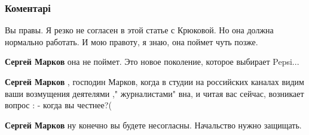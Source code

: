  
 
 
 
 
\subsubsection{Коментарі}

\begin{itemize}
 

Вы правы. Я резко не согласен в этой статье с Крюковой. Но она должна нормально
работать. И мою правоту, я знаю, она поймет чуть позже.

\begin{itemize}
 
\textbf{Сергей Марков} она не поймет. Это новое поколение, которое выбирает Pepsi...

 
\textbf{Сергей Марков} , господин Марков, когда в студии на российских каналах видим ваши возмущения деятелями ," журналистами" вна, и читая вас сейчас, возникает вопрос : - когда вы честнее?(

 
\textbf{Сергей Марков} ну конечно вы будете несогласны. Начальство нужно защищать.
\end{itemize}


\end{itemize}
